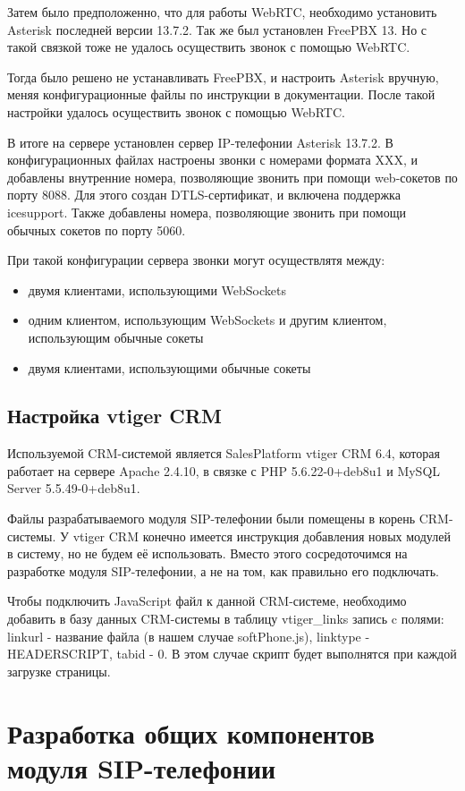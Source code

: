 Затем было предположенно, что для работы WebRTC, необходимо установить Asterisk последней версии 13.7.2. Так же был установлен FreePBX 13. Но с такой связкой тоже не удалось осуществить звонок с помощью WebRTC.

Тогда было решено не устанавливать FreePBX, и настроить Asterisk вручную, меняя конфигурационные файлы по инструкции в документации.\cite{asterisk} После такой настройки удалось осуществить звонок с помощью WebRTC.

В итоге на сервере установлен сервер IP-телефонии Asterisk 13.7.2. В конфигурационных файлах настроены звонки с номерами формата XXX, и добавлены внутренние номера, позволяющие звонить при помощи web-сокетов по порту 8088. Для этого создан DTLS-сертификат, и включена поддержка icesupport. Также добавлены номера, позволяющие звонить при помощи обычных сокетов по порту 5060.

При такой конфигурации сервера звонки могут осуществлятя между:
\begin{itemize}
\item двумя клиентами, использующими WebSockets
\item одним клиентом, использующим WebSockets и другим клиентом, использующим обычные сокеты
\item двумя клиентами, использующими обычные сокеты
\end{itemize}


\subsection{Настройка vtiger CRM}

Используемой CRM-системой является SalesPlatform vtiger CRM 6.4, которая работает на сервере Apache 2.4.10, в связке с PHP 5.6.22-0+deb8u1 и MySQL Server 5.5.49-0+deb8u1.

Файлы разрабатываемого модуля SIP-телефонии были помещены в корень CRM-системы. У vtiger CRM конечно имеется инструкция добавления новых модулей в систему, но не будем её использовать. Вместо этого сосредоточимся на разработке модуля SIP-телефонии, а не на том, как правильно его подключать.

Чтобы подключить JavaScript файл к данной CRM-системе, необходимо добавить в базу данных CRM-системы в таблицу vtiger\_links запись c полями: linkurl - название файла (в нашем случае softPhone.js), linktype - HEADERSCRIPT, tabid - 0.\cite{vtiger_db} В этом случае скрипт будет выполнятся при каждой загрузке страницы.

\section{Разработка общих компонентов модуля SIP-телефонии}


